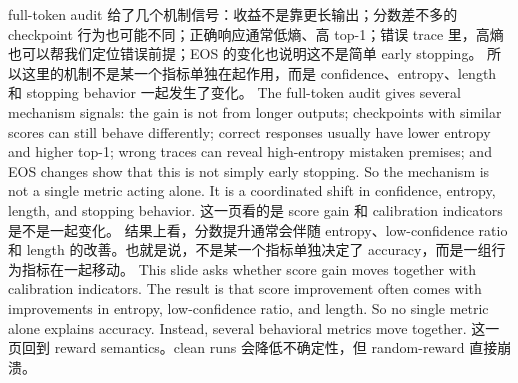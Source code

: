 {}\markdownRendererHorizontalRule{}\markdownRendererInterblockSeparator
{}\markdownRendererInterblockSeparator
{}\markdownRendererInterblockSeparator
{}full-token audit 给了几个机制信号：收益不是靠更长输出；分数差不多的 checkpoint 行为也可能不同；正确响应通常低熵、高 top-1；错误 trace 里，高熵也可以帮我们定位错误前提；EOS 的变化也说明这不是简单 early stopping。\markdownRendererInterblockSeparator
{}所以这里的机制不是某一个指标单独在起作用，而是 confidence、entropy、length 和 stopping behavior 一起发生了变化。\markdownRendererInterblockSeparator
{}\markdownRendererInterblockSeparator
{}The full-token audit gives several mechanism signals: the gain is not from longer outputs; checkpoints with similar scores can still behave differently; correct responses usually have lower entropy and higher top-1; wrong traces can reveal high-entropy mistaken premises; and EOS changes show that this is not simply early stopping.\markdownRendererInterblockSeparator
{}So the mechanism is not a single metric acting alone. It is a coordinated shift in confidence, entropy, length, and stopping behavior.\markdownRendererInterblockSeparator
{}\markdownRendererHorizontalRule{}\markdownRendererInterblockSeparator
{}\markdownRendererInterblockSeparator
{}\markdownRendererInterblockSeparator
{}这一页看的是 score gain 和 calibration indicators 是不是一起变化。\markdownRendererInterblockSeparator
{}结果上看，分数提升通常会伴随 entropy、low-confidence ratio 和 length 的改善。也就是说，不是某一个指标单独决定了 accuracy，而是一组行为指标在一起移动。\markdownRendererInterblockSeparator
{}\markdownRendererInterblockSeparator
{}This slide asks whether score gain moves together with calibration indicators.\markdownRendererInterblockSeparator
{}The result is that score improvement often comes with improvements in entropy, low-confidence ratio, and length. So no single metric alone explains accuracy. Instead, several behavioral metrics move together.\markdownRendererInterblockSeparator
{}\markdownRendererHorizontalRule{}\markdownRendererInterblockSeparator
{}\markdownRendererInterblockSeparator
{}\markdownRendererInterblockSeparator
{}这一页回到 reward semantics。clean runs 会降低不确定性，但 random-reward 直接崩溃。\markdownRendererInterblockSeparator
